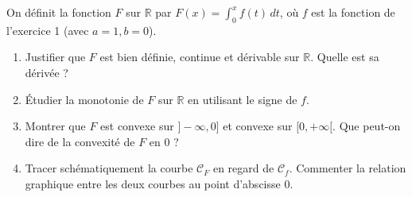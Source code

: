 \documentclass[11pt]{article}
\begin{document}
\begin{exercice}
On définit la fonction $F$ sur $\mathbb{R}$ par $F(x) = \int_0^x f(t)\,dt$, où $f$ est la fonction de l'exercice 1 (avec $a=1, b=0$).
\begin{enumerate}
    \item Justifier que $F$ est bien définie, continue et dérivable sur $\mathbb{R}$. Quelle est sa dérivée ?
    \item Étudier la monotonie de $F$ sur $\mathbb{R}$ en utilisant le signe de $f$.
    \item Montrer que $F$ est convexe sur $]-\infty, 0]$ et convexe sur $[0, +\infty[$. Que peut-on dire de la convexité de $F$ en $0$ ?
    \item Tracer schématiquement la courbe $\mathcal{C}_F$ en regard de $\mathcal{C}_f$. Commenter la relation graphique entre les deux courbes au point d'abscisse $0$.
\end{enumerate}
\end{exercice}
\end{document}
